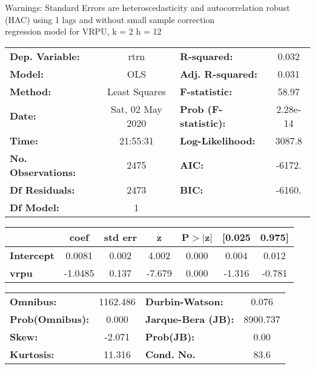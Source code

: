 Warnings: \newline
 [1] Standard Errors are heteroscedasticity and autocorrelation robust (HAC) using 1 lags and without small sample correction\\ 

regression model for VRPU, k = 2 h = 12\begin{center}
\begin{tabular}{lclc}
\toprule
\textbf{Dep. Variable:}    &       rtrn       & \textbf{  R-squared:         } &     0.032   \\
\textbf{Model:}            &       OLS        & \textbf{  Adj. R-squared:    } &     0.031   \\
\textbf{Method:}           &  Least Squares   & \textbf{  F-statistic:       } &     58.97   \\
\textbf{Date:}             & Sat, 02 May 2020 & \textbf{  Prob (F-statistic):} &  2.28e-14   \\
\textbf{Time:}             &     21:55:31     & \textbf{  Log-Likelihood:    } &    3087.8   \\
\textbf{No. Observations:} &        2475      & \textbf{  AIC:               } &    -6172.   \\
\textbf{Df Residuals:}     &        2473      & \textbf{  BIC:               } &    -6160.   \\
\textbf{Df Model:}         &           1      & \textbf{                     } &             \\
\bottomrule
\end{tabular}
\begin{tabular}{lcccccc}
                   & \textbf{coef} & \textbf{std err} & \textbf{z} & \textbf{P$> |$z$|$} & \textbf{[0.025} & \textbf{0.975]}  \\
\midrule
\textbf{Intercept} &       0.0081  &        0.002     &     4.002  &         0.000        &        0.004    &        0.012     \\
\textbf{vrpu}      &      -1.0485  &        0.137     &    -7.679  &         0.000        &       -1.316    &       -0.781     \\
\bottomrule
\end{tabular}
\begin{tabular}{lclc}
\textbf{Omnibus:}       & 1162.486 & \textbf{  Durbin-Watson:     } &    0.076  \\
\textbf{Prob(Omnibus):} &   0.000  & \textbf{  Jarque-Bera (JB):  } & 8900.737  \\
\textbf{Skew:}          &  -2.071  & \textbf{  Prob(JB):          } &     0.00  \\
\textbf{Kurtosis:}      &  11.316  & \textbf{  Cond. No.          } &     83.6  \\
\bottomrule
\end{tabular}
\end{center}

